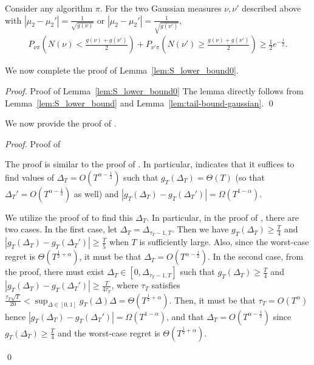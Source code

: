\documentclass[nonblindrev]{informs3_noinforms}
\begin{document}
{\begin{lemma}\label{lem:tail-bound-gaussian}
    Consider any algorithm $\pi$. For the two Gaussian measures $\nu,\nu'$ described above with $|\mu_2-\mu_2'|=\frac{1}{\sqrt{g(\nu)}}$ or $|\mu_2-\mu_2'|=\frac{1}{\sqrt{g(\nu')}}$,
    \begin{align*}
        P_{\nu\pi}\left(N(\nu)<\frac{g(\nu)+g(\nu')}{2}\right)+P_{\nu'\pi}\left(N(\nu')\geq\frac{g(\nu)+g(\nu')}{2}\right)\geq \frac{1}{2}e^{-\frac{1}{2}}.
    \end{align*}
\end{lemma}
We now complete the proof of Lemma~\ref{lem:S_lower_bound0}.

\begin{proof}{Proof of Lemma~\ref{lem:S_lower_bound0}}
The lemma directly follows from Lemma~\ref{lem:S_lower_bound} and Lemma~\ref{lem:tail-bound-gaussian}.
\qed
\end{proof}
}

We now provide the proof of . 
\begin{proof}{Proof of }
    {The proof is similar to the proof of . In particular,  indicates that it suffices to find values of $\Delta_T=O(T^{\alpha-\frac{1}{2}})$ such that $g_T(\Delta_T)=\Theta(T)$ (so that $\Delta_T'=O(T^{\alpha-\frac{1}{2}})$ as well) and $\left|g_T(\Delta_T)-g_T(\Delta_T')\right|=\Omega(T^{1-\alpha})$. 
    
    We utilize the proof of  to find this $\Delta_T$. In particular, in the proof of , there are two cases. In the first case, let $\Delta_{T}=\Delta_{\tau_T-1,T}$. Then we have $g_T(\Delta_T)\geq\frac{T}{4}$ and $\left|g_T(\Delta_T)-g_T(\Delta_T')\right|\geq\frac{T}{5}$ when $T$ is sufficiently large. Also, since the worst-case regret is $\Theta(T^{\frac{1}{2}+\alpha})$, it must be that $\Delta_T=O(T^{\alpha-\frac{1}{2}})$. In the second case, from the proof, there must exist $\Delta_T\in[0,\Delta_{\tau_T-1,T}]$ such that $g_T(\Delta_T)\geq\frac{T}{4}$ and $\left|g_T(\Delta_T)-g_T(\Delta_T')\right|\geq\frac{T}{4\tau_T}$, where $\tau_T$ satisfies $\frac{\tau_T\sqrt{T}}{20}<\sup_{\Delta\in[0,1]}g_T(\Delta)\Delta=\Theta(T^{\frac{1}{2}+\alpha})$. Then, it must be that $\tau_T=O(T^\alpha)$ hence $\left|g_T(\Delta_T)-g_T(\Delta_T')\right|=\Omega(T^{1-\alpha})$, and that $\Delta_T=O(T^{\alpha-\frac{1}{2}})$ since $g_T(\Delta_T)\geq\frac{T}{4}$ and the worst-case regret is $\Theta(T^{\frac{1}{2}+\alpha})$.} \qed
\end{proof}
\end{document}
